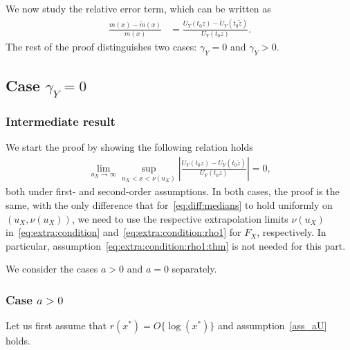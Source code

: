 \documentclass{statsoc}
\theoremstyle{break}
\newcommand{\tzero}{t_0}
\begin{document}
We now study the relative error term, which can be written as 
\begin{align}\label{eq:rewritting:relative:error}
	\frac{m(x) - \tilde m(x)}{ m(x)}& = \frac{U_Y(\tzero z) - \tilde U_Y(\tzero \tilde z)}{  U_Y(\tzero   z)}.
\end{align}
The rest of the proof distinguishes two cases: $\gamma_Y =0$ and $\gamma_Y >0$.




\subsection*{Case $\gamma_Y = 0$} 




\subsubsection{Intermediate result}

We start the proof by showing the following relation holds 
\begin{align}\label{eq:no:approx:U}
\lim_{u_X \to \infty }\sup_{ u_X  <  x < \nu(u_X) }  \left| \frac{U_Y(t_0 z) - U_Y(t_0 \tilde z)}{U_Y(t_0 z )}\right| = 0,
\end{align}
both under first- and second-order assumptions. In both cases, the proof is the same, with the only difference that for~\eqref{eq:diff:medians} to hold uniformly on $(u_X,\nu(u_X))$, we need to use the respective  extrapolation limits $\nu(u_X)$ in~\eqref{eq:extra:condition} and~\eqref{eq:extra:condition:rho1} for $F_X$, respectively. In particular, assumption~\eqref{eq:extra:condition:rho1:thm} is not needed for this part.




We consider the cases $a > 0$ and $a=0$ separately. 
\subsubsection*{Case $a > 0$} 

Let us first assume that $r(x^*) = O\{\log(x^*)\}$ and assumption~\eqref{ass_aU} holds.
\end{document}
